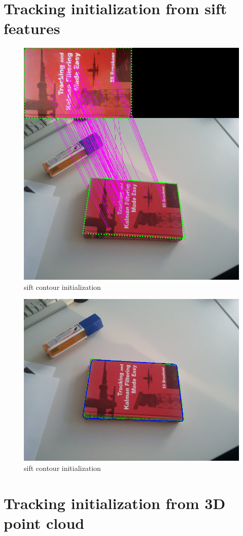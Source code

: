 \section{Tracking initialization from sift features}
\label{sec:tifsf}

\begin{figure}[htbp]
  \centering
\includegraphics[width=\linewidth]{images/sift.png}
  \caption{sift contour initialization}
  \label{"waiting for reftex-label call..."}
\end{figure}

\begin{figure}[htbp]
  \centering
\includegraphics[width=\linewidth]{images/sift_result.png}
  \caption{sift contour initialization}
  \label{"waiting for reftex-label call..."}
\end{figure}


\section{Tracking initialization from 3D point cloud}
\label{sec:tifpc}









